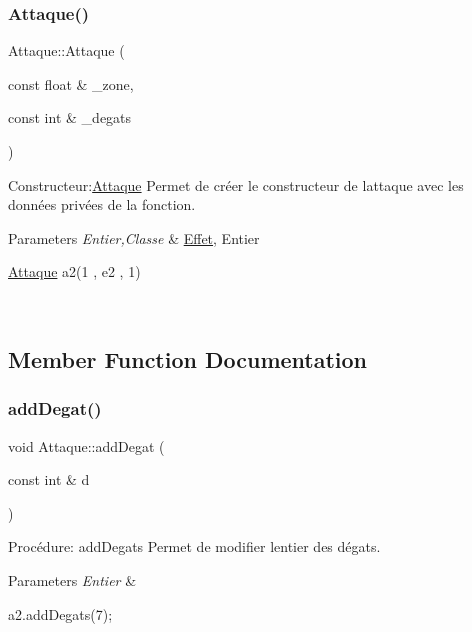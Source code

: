\subsubsection{\texorpdfstring{Attaque()}{Attaque()}\hspace{0.1cm}{\footnotesize\ttfamily [3/3]}}
{\footnotesize\ttfamily Attaque\+::\+Attaque (\begin{DoxyParamCaption}\item[{const float \&}]{\+\_\+zone,  }\item[{const int \&}]{\+\_\+degats }\end{DoxyParamCaption})}



Constructeur\+:\hyperlink{classAttaque}{Attaque} Permet de créer le constructeur de l\textquotesingle{}attaque avec les données privées de la fonction. 


\begin{DoxyParams}{Parameters}
{\em Entier,Classe} & \hyperlink{classEffet}{Effet}, Entier 
\begin{DoxyCode}
\hyperlink{classAttaque}{Attaque} a2(1 , e2 , 1)
\end{DoxyCode}
 \\
\hline
\end{DoxyParams}


\subsection{Member Function Documentation}
\mbox{\label{classAttaque_a47b0b804d6533953ed18fc8239f2cc1d}} 
\subsubsection{\texorpdfstring{add\+Degat()}{addDegat()}}
{\footnotesize\ttfamily void Attaque\+::add\+Degat (\begin{DoxyParamCaption}\item[{const int \&}]{d }\end{DoxyParamCaption})}



Procédure\+: add\+Degats Permet de modifier l\textquotesingle{}entier des dégats. 


\begin{DoxyParams}{Parameters}
{\em Entier} & 
\begin{DoxyCode}
a2.addDegats(7);
\end{DoxyCode}
 \\
\hline
\end{DoxyParams}
\mbox{\label{classAttaque_a1d4ca211e47b04d97bed004af117b550}} 
